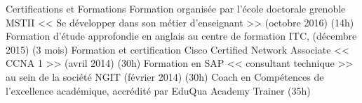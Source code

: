 \begin{rubric}{Certifications et Formations}
\entry*[]	 Formation organisée par l'école doctorale grenoble MSTII << Se développer dans son métier d'enseignant >> (octobre 2016) (14h)	
\entry*[]	 Formation d'étude approfondie en anglais au centre de formation ITC, (décembre 2015) (3 mois) 
\entry*[]	 Formation et certification Cisco Certified Network Associate << CCNA 1 >> (avril 2014) (30h)
\entry*[]	 Formation en SAP << consultant technique >> au sein de la société NGIT (février 2014) (30h)
    \entry*[] Coach en Compétences de l'excellence académique, accrédité par EduQua Academy Trainer (35h)
\end{rubric}
